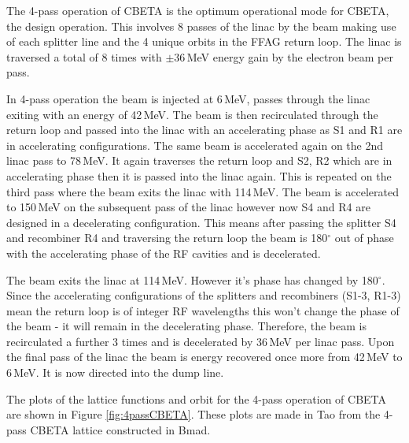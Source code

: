 \documentclass[11pt]{article}
\begin{document}
The 4-pass operation of CBETA is the optimum operational mode for CBETA, the design operation. This involves 8 passes of the linac by the beam making use of each splitter line and the 4 unique orbits in the FFAG return loop. The linac is traversed a total of 8 times with $\pm 36$\,MeV energy gain by the electron beam per pass. 

In 4-pass operation the beam is injected at 6\,MeV, passes through the linac exiting with an energy of 42\,MeV. The beam is then recirculated through the return loop and passed into the linac with an accelerating phase as S1 and R1 are in accelerating configurations. The same beam is accelerated again on the 2nd linac pass to 78\,MeV. It again traverses the return loop and S2, R2 which are in accelerating phase then it is passed into the linac again. This is repeated on the third pass where the beam exits the linac  with 114\,MeV. The beam is accelerated to 150\,MeV on the subsequent pass of the linac however now S4 and R4 are designed in a decelerating configuration. This means after passing the splitter S4 and recombiner R4 and traversing the return loop the beam is 180$^{\circ}$ out of phase with the accelerating phase of the RF cavities and is decelerated.

The beam exits the linac at 114\,MeV. However it's phase has changed by 180$^{\circ}$. Since the accelerating configurations of the splitters and recombiners (S1-3, R1-3) mean the return loop is of integer RF wavelengths this won't change the phase of the beam - it will remain in the decelerating phase. Therefore, the beam is recirculated a further 3 times and is decelerated by 36\,MeV per linac  pass. Upon the final pass of the linac the beam is energy recovered once more from 42\,MeV to 6\,MeV. It is now directed into the dump line. 

The plots of the lattice functions and orbit for the 4-pass operation of CBETA are shown in Figure \ref{fig:4passCBETA}. These plots are made in Tao from the 4-pass CBETA lattice constructed in Bmad.
\end{document}
